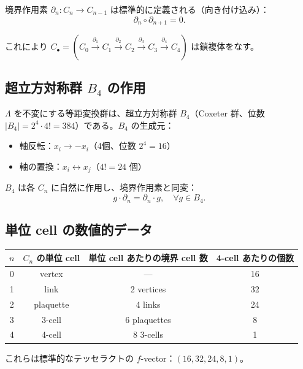 \documentclass[a4paper,11pt]{ltjsarticle}
\begin{document}
境界作用素 $\partial_n : C_n \to C_{n-1}$ は標準的に定義される（向き付け込み）：
\begin{equation}
\partial_n \circ \partial_{n+1} = 0. \tag{2.1}
\end{equation}

これにより $C_\bullet = (C_0 \xrightarrow{\partial_1} C_1 \xrightarrow{\partial_2} C_2 \xrightarrow{\partial_3} C_3 \xrightarrow{\partial_4} C_4)$ は鎖複体をなす。

\subsection{超立方対称群 $B_4$ の作用}

$\Lambda$ を不変にする等距変換群は、超立方対称群 $B_4$（Coxeter 群、位数 $|B_4| = 2^4 \cdot 4! = 384$）である。$B_4$ の生成元：

\begin{itemize}
\item 軸反転：$x_i \to -x_i$（4個、位数 $2^4 = 16$）
\item 軸の置換：$x_i \leftrightarrow x_j$（$4! = 24$ 個）
\end{itemize}

$B_4$ は各 $C_n$ に自然に作用し、境界作用素と同変：
\begin{equation}
g \cdot \partial_n = \partial_n \cdot g, \quad \forall g \in B_4. \tag{2.2}
\end{equation}

\subsection{単位 cell の数値的データ}

\begin{center}
\begin{tabular}{cccc}
\toprule
$n$ & $C_n$ の単位 cell & 単位 cell あたりの境界 cell 数 & 4-cell あたりの個数 \\
\midrule
0 & vertex & --- & 16 \\
1 & link & 2 vertices & 32 \\
2 & plaquette & 4 links & 24 \\
3 & 3-cell & 6 plaquettes & 8 \\
4 & 4-cell & 8 3-cells & 1 \\
\bottomrule
\end{tabular}
\end{center}

これらは標準的なテッセラクトの $f$-vector：$(16, 32, 24, 8, 1)$。
\end{document}
